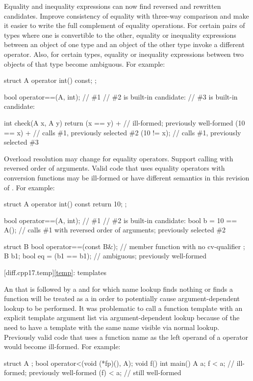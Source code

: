 \change
Equality and inequality expressions can now find
reversed and rewritten candidates.
\rationale
Improve consistency of equality with three-way comparison
and make it easier to write the full complement of equality operations.
\effect
For certain pairs of types where one is convertible to the other,
equality or inequality expressions between an object of one type
and an object of the other type invoke a different operator.
Also, for certain types, equality or inequality expressions
between two objects of that type become ambiguous.
For example:
\begin{codeblock}
struct A {
  operator int() const;
};

bool operator==(A, int);        // \#1
// \#2 is built-in candidate: 
// \#3 is built-in candidate: 

int check(A x, A y) {
  return (x == y) +             // ill-formed; previously well-formed
    (10 == x) +                 // calls \#1, previously selected \#2
    (10 != x);                  // calls \#1, previously selected \#3
}
\end{codeblock}

\change
Overload resolution may change for equality operators.
\rationale
Support calling  with reversed order of arguments.
\effect
Valid \CppXVII{} code that uses equality operators with conversion functions
may be ill-formed or have different semantics in this revision of \Cpp{}.
For example:
\begin{codeblock}
struct A {
  operator int() const { return 10; }
};

bool operator==(A, int);        // \#1
// \#2 is built-in candidate: 
bool b = 10 == A();             // calls \#1 with reversed order of arguments; previously selected \#2

struct B {
  bool operator==(const B&);    // member function with no cv-qualifier
};
B b1;
bool eq = (b1 == b1);           // ambiguous; previously well-formed
\end{codeblock}

[diff.cpp17.temp]{\ref{temp}: templates}

\change
An 
that is followed by a \tcode{<}
and for which name lookup
finds nothing or finds a function
will be treated as a 
in order to potentially cause argument-dependent lookup to be performed.
\rationale
It was problematic to call a function template
with an explicit template argument list
via argument-dependent lookup
because of the need to have a template with the same name
visible via normal lookup.
\effect
Previously valid code that uses a function name
as the left operand of a \tcode{<} operator
would become ill-formed.
For example:
\begin{codeblock}
struct A {};
bool operator<(void (*fp)(), A);
void f() {}
int main() {
  A a;
  f < a;    // ill-formed; previously well-formed
  (f) < a;  // still well-formed
}
\end{codeblock}

